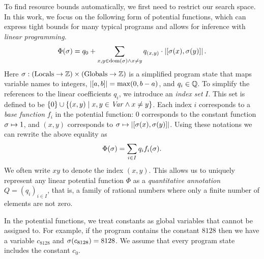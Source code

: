 \documentclass[letterpaper,11pt]{article}
\begin{document}
To find resource bounds automatically, we first need to restrict our
search space.  In this work, we focus on the following form of
potential functions, which can express tight bounds for many typical
programs and allows for inference with \emph{linear programming}.
$$
  \Phi(\sigma) = q_0 + \sum_{x, y \in  \text{dom}(\sigma) \land x \neq y}
    q_{(x, y)} \cdot |[\sigma(x),\sigma(y)]| \, .
$$
%
Here $\sigma : (\text{Locals} \to \mathbb{Z}) \times (\text{Globals} \to \mathbb{Z})$
is a simplified program state that maps variable names to integers,
$|[a,b]| = \max(0,b-a)$, and $q_i \in \mathbb{Q}$.  To simplify the
references to the linear coefficients $q_i$, we introduce an \emph{index
  set} $I$.  This set is defined to be $\{0\} \cup \{(x, y) \mid x, y
\in \mathit{Var} \land x \neq y \}$.  Each index $i$ corresponds to a \emph{base function}
$f_i$ in the potential function: $0$ corresponds to the constant
function $\sigma \mapsto 1$, and $(x,y)$ corresponds to $\sigma \mapsto
|[\sigma(x),\sigma(y)]|$.  Using these notations we can
rewrite the above equality as 
$$ \Phi(\sigma) = \sum_{i \in I} q_i f_i(\sigma).$$
%
We often write $xy$ to denote the
index $(x,y)$.  This allows us to
uniquely represent any linear potential function
$\Phi$ as a \emph{quantitative annotation} $Q = (q_i)_{i \in I}$, that
is, a family of rational numbers where only
a finite number of elements are not zero.  

In the potential functions, we treat constants as global variables
that cannot be assigned to.  For example, if the program contains the
constant $8128$ then we have a variable $c_{8128}$ and
$\sigma(c_{8128}) = 8128$.  We assume that every program state
includes the constant $c_0$.
\end{document}
